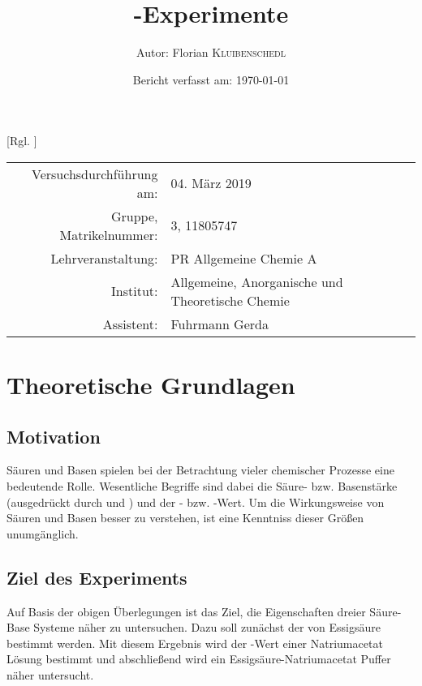 \documentclass{article}
\title{\pH-Experimente \cite{Versuchsvorschrift}} %
\author{Autor: Florian \textsc{Kluibenschedl}} %
\date{Bericht verfasst am: \today} %
\begin{document}
  [Rgl. ]{}{}
  
  \maketitle %
  
  \begin{center}
    \begin{tabular}{r p{4cm}}
      Versuchsdurchführung am: & 04. März 2019\\ %
      Gruppe, Matrikelnummer: & 3, 11805747 \\
      Lehrveranstaltung: & PR Allgemeine Chemie A \\
      Institut: & Allgemeine, Anorganische und Theoretische Chemie \\
      Assistent: & Fuhrmann Gerda %
    \end{tabular}
  \end{center}


  \begin{abstract}
    
  \end{abstract}
  
  \pagebreak
  
  \section{Theoretische Grundlagen}
  
    \subsection{Motivation} \label{sec:Motivation}
      Säuren und Basen spielen bei der Betrachtung vieler chemischer Prozesse eine bedeutende Rolle. Wesentliche Begriffe sind dabei die Säure- bzw. Basenstärke (ausgedrückt durch \pKa und \pKb) und der \pH- bzw. \pOH-Wert. Um die Wirkungsweise von Säuren und Basen besser zu verstehen, ist eine Kenntniss dieser Größen unumgänglich.  
  
    \subsection{Ziel des Experiments}
    
      Auf Basis der obigen Überlegungen ist das Ziel, die Eigenschaften dreier Säure-Base Systeme näher zu untersuchen. Dazu soll zunächst der \pKa von Essigsäure bestimmt werden. Mit diesem Ergebnis wird der \pH-Wert einer Natriumacetat Lösung bestimmt und abschließend wird ein Essigsäure-Natriumacetat Puffer näher untersucht.
    
\end{document}
